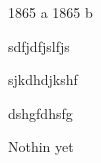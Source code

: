\documentclass[9pt]{developercv} %
\begin{document}


\begin{entrylist}
	 \entry
		   {1865}
		   {a}
		{ }
		{ }
	 \entry
		   {1865}
		   {b}
		{ }
		{ }
\end{entrylist}



\begin{minipage}[t]{0.3\textwidth}
	\vspace{-\baselineskip} %
	
	
	sdfjdfjslfjs


sjkdhdjkshf



dshgfdhsfg
\end{minipage}
\hfill
\begin{minipage}[t]{0.3\textwidth}
	\vspace{-\baselineskip} %
	
	
	Nothin yet
\end{minipage}

\end{document}

